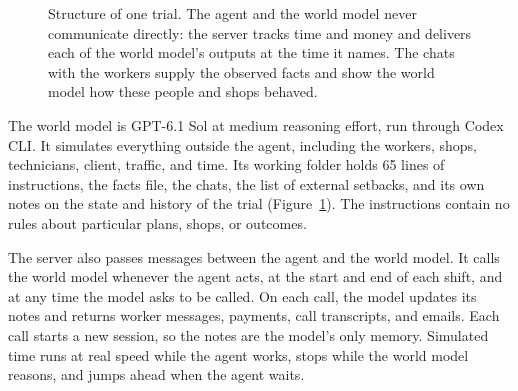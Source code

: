 \documentclass[10pt]{article}
\begin{document}
\begin{figure}[t]
  \caption{Structure of one trial. The agent and the world model never communicate directly: the server tracks time and money and delivers each of the
  world model's outputs at the time it names. The chats with the workers supply the observed facts and show the world model how these people and shops behaved.}
  \label{fig:arch}
\end{figure}

The world model is GPT-6.1 Sol at medium reasoning effort, run through Codex CLI. It simulates everything outside the agent, including the workers, shops, technicians, client, traffic, and time. Its working folder holds 65 lines of instructions, the facts file, the chats, the list of external setbacks, and its own notes on the state and history of the trial (Figure~\ref{fig:arch}). The instructions contain no rules about particular plans, shops, or outcomes.

The server also passes messages between the agent and the world model. It calls the world model whenever the agent acts, at the start and end of each shift, and at any time the model asks to be called. On each call, the model updates its notes and returns worker messages, payments, call transcripts, and emails. Each call starts a new session, so the notes are the model's only memory.
Simulated time runs at real speed while the agent works, stops while the world model reasons, and jumps ahead when the agent waits.
\end{document}
